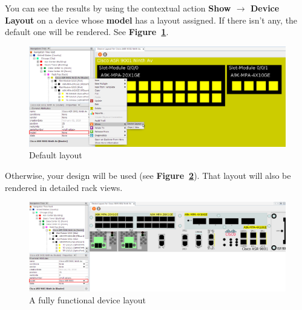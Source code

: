 \documentclass[a4paper]{article}
\begin{document}
	You can see the results by using the contextual action \textbf{Show $\rightarrow$ Device Layout} on a device whose \textbf{model} has a layout assigned. If there isn't any, the default one will be rendered. See \textbf{Figure~\ref{fig:device_layout_default}}.
	
	\begin{figure}[h!]
		\centering
		\includegraphics[width=0.99\linewidth]{img/device_layout_default.png}
		\caption{Default layout}
		\label{fig:device_layout_default}
	\end{figure}
	
	Otherwise, your design will be used (see \textbf{Figure~\ref{fig:device_layout_render}}). That layout will also be rendered in detailed rack views.
	
	\begin{figure}[h!]
		\centering
		\includegraphics[width=0.99\linewidth]{img/device_layout_show.png}
		\caption{A fully functional device layout}
		\label{fig:device_layout_render}
	\end{figure}
			
	\clearpage
\end{document}
